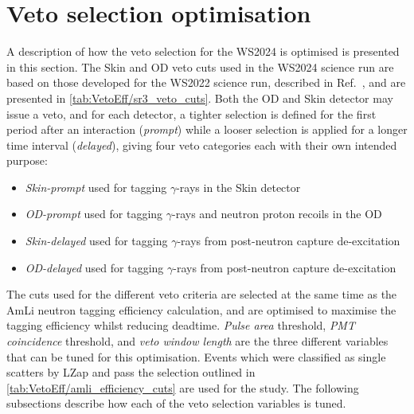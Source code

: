 \section{Veto selection optimisation}\label{sec:VetoEff/VetoSelectionOptimisation}
A description of how the veto selection for the WS2024 is optimised is presented in this section. The Skin and OD veto cuts used in the WS2024 science run are based on those developed for the WS2022 science run, described in Ref.~\cite{LZ:2022lsv}, and are presented in \autoref{tab:VetoEff/sr3_veto_cuts}.
Both the OD and Skin detector may issue a veto, and for each detector, a tighter selection is defined for the first period after an interaction (\textit{prompt}) while a looser selection is applied for a longer time interval (\textit{delayed}), giving four veto categories each with their own intended purpose:
\begin{itemize}
	\item \textit{Skin-prompt} used for tagging $\gamma$-rays in the Skin detector
	\item \textit{OD-prompt} used for tagging $\gamma$-rays and neutron proton recoils in the OD
	\item \textit{Skin-delayed} used for tagging $\gamma$-rays from post-neutron capture de-excitation
	\item \textit{OD-delayed} used for tagging $\gamma$-rays from post-neutron capture de-excitation
\end{itemize}
The cuts used for the different veto criteria are selected at the same time as the AmLi neutron tagging efficiency calculation, and are optimised to maximise the tagging efficiency whilst reducing deadtime. \textit{Pulse area} threshold, \textit{PMT coincidence} threshold, and \textit{veto window length} are the three different variables that can be tuned for this optimisation. Events which were classified as single scatters by LZap and pass the selection outlined in \autoref{tab:VetoEff/amli_efficiency_cuts} are used for the study. The following subsections describe how each of the veto selection variables is tuned.

